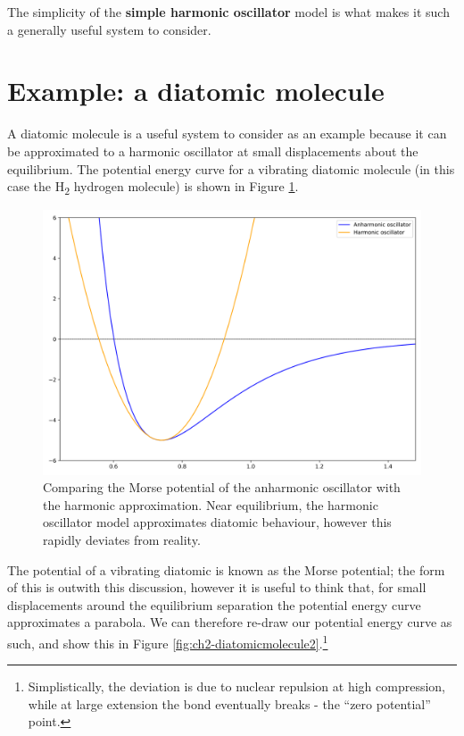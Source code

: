\documentclass[
]{book}
\begin{document}
The simplicity of the \textbf{simple harmonic oscillator} model is what makes it such a generally useful system to consider.

\hypertarget{sec:ch2-diatomicmolecule}{%
\section{Example: a diatomic molecule}\label{sec:ch2-diatomicmolecule}}

A diatomic molecule is a useful system to consider as an example because it can be approximated to a harmonic oscillator at small displacements about the equilibrium. The potential energy curve for a vibrating diatomic molecule (in this case the H\textsubscript{2} hydrogen molecule) is shown in Figure \ref{fig:ch2-diatomicmolecule1}.

\begin{figure}

{\centering \includegraphics[width=0.7\linewidth]{visualisations/ch2-diatomicexamp} 

}

\caption{Comparing the Morse potential of the anharmonic oscillator with the harmonic approximation. Near equilibrium, the harmonic oscillator model approximates diatomic behaviour, however this rapidly deviates from reality. }\label{fig:ch2-diatomicmolecule1}
\end{figure}

The potential of a vibrating diatomic is known as the Morse potential; the form of this is outwith this discussion, however it is useful to think that, for small displacements around the equilibrium separation the potential energy curve approximates a parabola. We can therefore re-draw our potential energy curve as such, and show this in Figure \ref{fig:ch2-diatomicmolecule2}.\footnote{Simplistically, the deviation is due to nuclear repulsion at high compression, while at large extension the bond eventually breaks - the ``zero potential'' point.}
\end{document}
